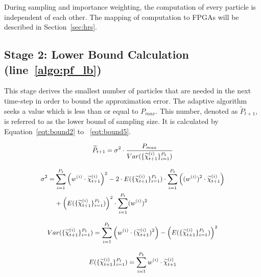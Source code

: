 During sampling and importance weighting, the computation of every particle is independent of each other. 
The mapping of computation to FPGAs will be described in Section~\ref{sec:hrs}.

\subsection{Stage 2: Lower Bound Calculation (line~\ref{algo:pf_lb})} 
This stage derives the smallest number of particles that are needed in the next time-step in order to bound the approximation error.
The adaptive algorithm seeks a value which is less than or equal to $P_{max}$.
This number, denoted as $\widetilde{P}_{t+1}$, is referred to as the lower bound of sampling size.
It is calculated by Equation~\ref{eqt:bound2} to ~\ref{eqt:bound5}.

\begin{equation}
\small
\begin{aligned}
\widetilde{P}_{t+1} = \sigma^2 \cdot \frac{P_{max}}{Var(\{\widetilde{\chi}_{t+1}^{(i)}\}^{P_t}_{i=1})}
\end{aligned}
\label{eqt:bound2}
\end{equation}

\begin{eqnarray}
\small
\begin{aligned}
\sigma^2 = & \sum_{i=1}^{P_{t}}\left({w}^{(i)} \cdot \widetilde{\chi}_{t+1}^{(i)} \right)^2 - 2 \cdot E(\{\widetilde{\chi}_{t+1}^{(i)}\}^{P_t}_{i=1}) \cdot \sum_{i=1}^{P_{t}} \left ( ({w}^{(i)})^2 \cdot \widetilde{\chi}_{t+1}^{(i)} \right ) \\
& + \left(E(\{\widetilde{\chi}_{t+1}^{(i)}\}^{P_t}_{i=1})\right)^2 \cdot \sum_{i=1}^{P_{t}}({w}^{(i)})^2
\end{aligned}
\label{eqt:bound3}
\end{eqnarray}

\begin{equation}
\small
\begin{aligned}
Var(\{\widetilde{\chi}_{t+1}^{(i)}\}^{P_t}_{i=1}) = \sum_{i=1}^{P_{t}} \left ( {w}^{(i)} \cdot (\widetilde{\chi}_{t+1}^{(i)})^2 \right ) - \left( E(\{\widetilde{\chi}_{t+1}^{(i)}\}^{P_t}_{i=1}) \right)^2
\end{aligned}
\label{eqt:bound4}
\end{equation}

\begin{equation}
\small
\begin{aligned}
E(\{\widetilde{\chi}_{t+1}^{(i)}\}^{P_t}_{i=1}) = \sum_{i=1}^{P_{t}} {w}^{(i)} \cdot \widetilde{\chi}_{t+1}^{(i)}
\end{aligned}
\label{eqt:bound5}
\end{equation}


